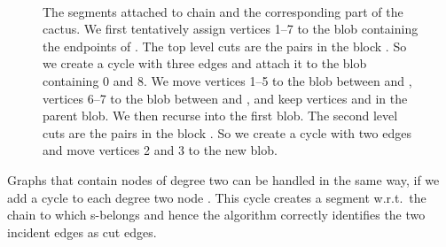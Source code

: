 \documentclass[paper=a4]{scrartcl}
\begin{document}
\begin{figure}[t]
\centering
{}\\\vspace{5ex}
\caption{\label{fig:cactus} The segments attached to chain  and the corresponding part of the cactus. We first tentatively assign vertices 1--7 to the blob containing the endpoints  of . The top level cuts  are the pairs in the block . So we create a cycle with three edges and attach it to the blob containing 0 and 8. We move vertices 1--5 to the blob between  and , vertices 6--7 to the blob between  and , and keep vertices  and  in the parent blob. We then recurse into the first blob. The second level cuts are the pairs in the block . So we create a cycle with two edges and move vertices 2 and 3 to the new blob.}
\end{figure}

Graphs that contain nodes of degree two can be handled in the same way, if we add a cycle to each degree two node . This cycle creates a segment w.r.t.\ the chain to which  s-belongs and hence the algorithm correctly identifies the two incident edges as cut edges.
\end{document}

